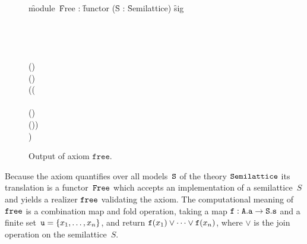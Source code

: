 \begin{figure}
  \centering
\begin{showOutputSmall}
\f{module}\ \f{Free} : \f{functor} (\f{S} : \f{Semilattice}) \to \f{sig}\\
\quad {}
\\
\quad
{}
\\
\quad\quad
{}\\
\qquad\qquad {} \land {} \land {}\\
\qquad\qquad () \land {} \\
\qquad\qquad () \land {} \\
\qquad\qquad
((\\
\qquad\qquad\qquad
{} \land
{} \land {} \\
\qquad\qquad\qquad () \land {} \\
\qquad\qquad\qquad
()) \Rightarrow {} \\
\qquad\qquad
{})
\end{showOutputSmall}%
  \caption{Output of axiom $\texttt{free}$.}
  \label{fig:free}
\end{figure}
%
Because the axiom quantifies over all models~$\mathtt{S}$ of the theory
$\mathtt{Semilattice}$ its translation is a functor~$\mathtt{Free}$ which
accepts an implementation of a semilattice~$S$ and yields a realizer
$\mathtt{free}$ validating the axiom. The computational meaning of
$\mathtt{free}$ is a combination map and fold operation, taking a map
$\mathtt{f} : \mathtt{A.a} \to \mathtt{S.s}$ and a finite set~$\mathtt{u} = \{x_1,
  \ldots, x_n\}$, and return $\mathtt{f}(x_1) \vee \cdots \vee \mathtt{f}(x_n)$,
where $\vee$ is the join operation on the semilattice~$S$.

